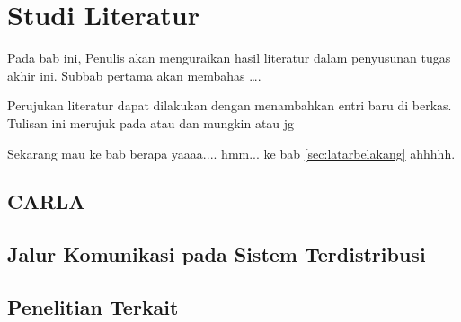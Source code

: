 \chapter{Studi Literatur}


Pada bab ini, Penulis akan menguraikan hasil literatur dalam penyusunan tugas
akhir ini. Subbab pertama akan membahas \dots .

Perujukan literatur dapat dilakukan dengan menambahkan entri baru di berkas.
Tulisan ini merujuk pada \parencite{knuth2001art,vasp1} atau
\parencite{4026885} dan \parencite{Kim2006} mungkin atau jg \parencite{dov17carla}

Sekarang mau ke bab berapa yaaaa.... hmm... ke bab \ref{sec:latarbelakang} ahhhhh. 

\section{CARLA}
\blindtext

\section{Jalur Komunikasi pada Sistem Terdistribusi}
\blindtext

\section{Penelitian Terkait}
\blindtext

